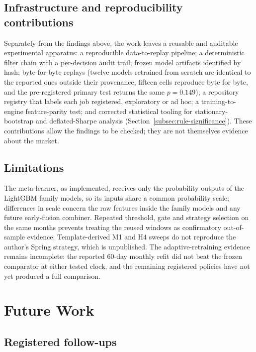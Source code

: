 \subsection{Infrastructure and reproducibility contributions} \label{subsec:infra-contributions}

Separately from the findings above, the work leaves a reusable and auditable experimental apparatus: a reproducible data-to-replay pipeline; a deterministic filter chain with a per-decision audit trail; frozen model artifacts identified by hash; byte-for-byte replays (twelve models retrained from scratch are identical to the reported ones outside their provenance, fifteen cells reproduce byte for byte, and the pre-registered primary test returns the same $p = 0.149$); a repository registry that labels each job registered, exploratory or ad hoc; a training-to-engine feature-parity test; and corrected statistical tooling for stationary-bootstrap and deflated-Sharpe analysis (Section~\ref{subsec:rule-significance}). These contributions allow the findings to be checked; they are not themselves evidence about the market.

\subsection{Limitations} \label{subsec:limitations}

The meta-learner, as implemented, receives only the probability outputs of the LightGBM family models, so its inputs share a common probability scale; differences in scale concern the raw features inside the family models and any future early-fusion combiner. Repeated threshold, gate and strategy selection on the same months prevents treating the reused windows as confirmatory out-of-sample evidence. Template-derived M1 and H4 sweeps do not reproduce the author's Spring strategy, which is unpublished. The adaptive-retraining evidence remains incomplete: the reported 60-day monthly refit did not beat the frozen comparator at either tested clock, and the remaining registered policies have not yet produced a full comparison.

\section{Future Work} \label{sec:future-work}

\subsection{Registered follow-ups} \label{subsec:future-registered}

